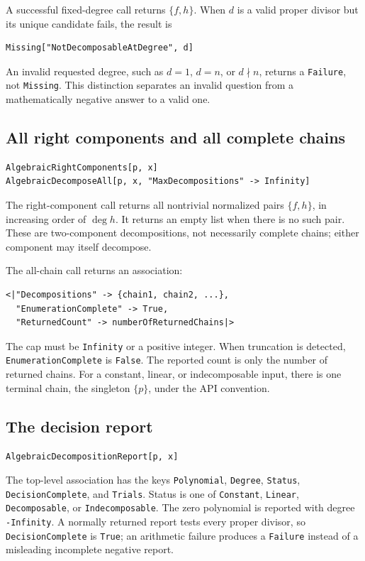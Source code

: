 \documentclass[11pt,letterpaper]{article}
\theoremstyle{definition}
\theoremstyle{remark}
\newcommand{\wt}[1]{\texttt{#1}}
\begin{document}
A successful fixed-degree call returns $\{f,h\}$. When $d$ is a valid
proper divisor but its unique candidate fails, the result is
\begin{lstlisting}
Missing["NotDecomposableAtDegree", d]
\end{lstlisting}
An invalid requested degree, such as $d=1$, $d=n$, or $d\nmid n$,
returns a \wt{Failure}, not \wt{Missing}. This distinction separates an
invalid question from a mathematically negative answer to a valid one.

\subsection{All right components and all complete chains}
\begin{lstlisting}
AlgebraicRightComponents[p, x]
AlgebraicDecomposeAll[p, x, "MaxDecompositions" -> Infinity]
\end{lstlisting}
The right-component call returns all nontrivial normalized pairs
$\{f,h\}$, in increasing order of $\deg h$. It returns an empty list
when there is no such pair. These are two-component decompositions, not
necessarily complete chains; either component may itself decompose.

The all-chain call returns an association:
\begin{lstlisting}
<|"Decompositions" -> {chain1, chain2, ...},
  "EnumerationComplete" -> True,
  "ReturnedCount" -> numberOfReturnedChains|>
\end{lstlisting}
The cap must be \wt{Infinity} or a positive integer. When truncation is
detected, \wt{EnumerationComplete} is \wt{False}. The reported count
is only the number of returned chains. For a constant, linear, or
indecomposable input, there is one terminal chain, the singleton
$\{p\}$, under the API convention.

\subsection{The decision report}
\begin{lstlisting}
AlgebraicDecompositionReport[p, x]
\end{lstlisting}
The top-level association has the keys \wt{Polynomial}, \wt{Degree},
\wt{Status}, \wt{DecisionComplete}, and \wt{Trials}. Status is one
of \wt{Constant}, \wt{Linear}, \wt{Decomposable}, or
\wt{Indecomposable}. The zero polynomial is reported with degree
\wt{-Infinity}. A normally returned report tests every proper divisor,
so \wt{DecisionComplete} is \wt{True}; an arithmetic failure produces
a \wt{Failure} instead of a misleading incomplete negative report.
\end{document}
